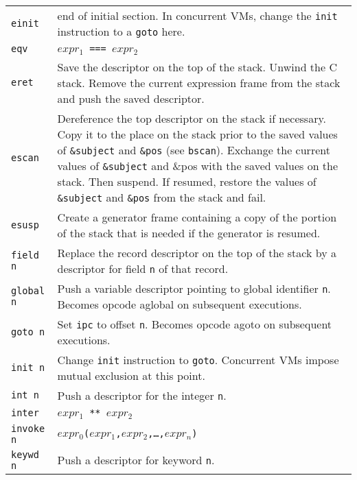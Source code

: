 \begin{xtabular}{l@{\hspace{1.5cm}}p{13.5cm}}
\texttt{\color{blue}einit} & end of initial section. In concurrent
 VMs, change the \texttt{init} instruction to a \texttt{goto} here. \\

\texttt{eqv}   & \texttt{$expr_1$ === $expr_2$}\\

\texttt{eret}  & Save the descriptor on the top of the stack. Unwind the C
stack. Remove the current expression frame from the stack and push the
saved descriptor.\\

\texttt{escan} & Dereference the top descriptor on the stack if necessary. Copy
it to the place on the stack prior to the saved values of \texttt{\&subject} and
\texttt{\&pos} (see \texttt{bscan}). Exchange the current values of
\texttt{\texttt{\&subject}} and \&pos with the saved values on the stack. Then
suspend. If resumed, restore the values of \texttt{\&subject} and \texttt{\&pos}
from the stack and fail.\\

\texttt{esusp} & Create a generator frame containing a copy of the portion of
the stack that is needed if the generator is resumed.\\

\texttt{field n} & Replace the record descriptor on the top of the stack by a
descriptor for field \texttt{n} of that record.\\

\texttt{global n} & Push a variable descriptor pointing to global
identifier \texttt{n}. Becomes opcode aglobal on subsequent executions.\\

\texttt{goto n} & Set \texttt{ipc} to offset \texttt{n}.
Becomes opcode agoto on subsequent executions.\\

\texttt{init n} & Change \texttt{init} instruction to \texttt{goto}.
{\color{blue}Concurrent VMs impose mutual exclusion at this point.}\\

\texttt{int n}  & Push a descriptor for the integer \texttt{n}.\\

\texttt{inter}  & \texttt{$expr_1$ ** $expr_2$}\\

\texttt{invoke n} & \texttt{$expr_0$($expr_1$,$expr_2$,\dots,$expr_n$)}\\

\texttt{keywd n} & Push a descriptor for keyword \texttt{n}.\\


\end{xtabular}
